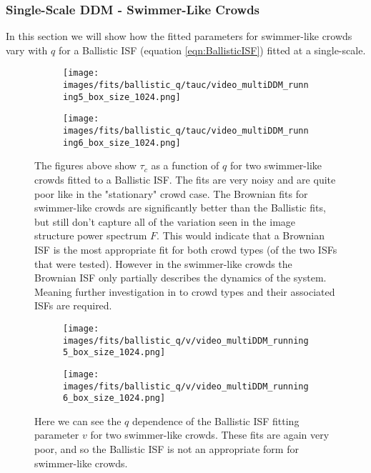 \documentclass[10pt]{article}
\begin{document}
\subsubsection{Single-Scale DDM - Swimmer-Like Crowds}
In this section we will show how the fitted parameters for swimmer-like crowds vary with $q$ for a Ballistic ISF (equation \ref{eqn:BallisticISF}) fitted at a single-scale.

\begin{figure}[H]
\begin{subfigure}[t]{.5\textwidth}
  \centering
  \texttt{[image: images/fits/ballistic\_q/tauc/video\_multiDDM\_running5\_box\_size\_1024.png]}
  \caption{}
\end{subfigure}%
\hfill
\begin{subfigure}[t]{.5\textwidth}
  \centering
  \texttt{[image: images/fits/ballistic\_q/tauc/video\_multiDDM\_running6\_box\_size\_1024.png]}
  \caption{}
\end{subfigure}
\caption{The figures above show $\tau_c$ as a function of $q$ for two swimmer-like crowds fitted to a Ballistic ISF. The fits are very noisy and are quite poor like in the "stationary" crowd case. The Brownian fits for swimmer-like crowds are significantly better than the Ballistic fits, but still don't capture all of the variation seen in the image structure power spectrum $F$. This would indicate that a Brownian ISF is the most appropriate fit for both crowd types (of the two ISFs that were tested). However in the swimmer-like crowds the Brownian ISF only partially describes the dynamics of the system. Meaning further investigation in to crowd types and their associated ISFs are required.}
\label{fig:running_ballistic_fits_tauc}
\end{figure}

\begin{figure}[H]
\begin{subfigure}[t]{.5\textwidth}
  \centering
  \texttt{[image: images/fits/ballistic\_q/v/video\_multiDDM\_running5\_box\_size\_1024.png]}
  \caption{}
\end{subfigure}%
\hfill
\begin{subfigure}[t]{.5\textwidth}
  \centering
  \texttt{[image: images/fits/ballistic\_q/v/video\_multiDDM\_running6\_box\_size\_1024.png]}
  \caption{}
\end{subfigure}
\caption{Here we can see the $q$ dependence of the Ballistic ISF fitting parameter $v$ for two swimmer-like crowds. These fits are again very poor, and so the Ballistic ISF is not an appropriate form for swimmer-like crowds.}
\label{fig:running_ballistic_fits_v}
\end{figure}
\end{document}
